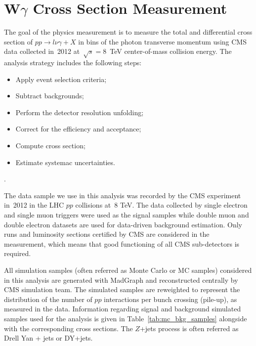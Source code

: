 \chapter{W$\gamma$ Cross Section Measurement}
\label{sec:AN_WgMeas}
The goal of the physics measurement is to measure the total and differential cross section of $pp \rightarrow l\nu\gamma + X$ in bins of the photon transverse momentum using CMS data collected in~2012 at~$\sqrt{s}=8$~TeV center-of-mass collision energy. The analysis strategy includes the following steps:
\begin{itemize}
  \item Apply event selection criteria;
  \item Subtract backgrounds;
  \item Perform the detector resolution unfolding;
  \item Correct for the efficiency and acceptance;
  \item Compute cross section;
  \item Estimate systemac uncertainties.
\end{itemize}
.

The data sample we use in this analysis was recorded by the CMS experiment in~2012 in the LHC $pp$ collisions at~8 TeV. The data collected by single electron and single muon triggers were used as the signal samples while double muon and double electron datasets are used for data-driven background estimation. Only runs and luminosity sections certified by CMS are considered in the measurement, which means that good functioning of all CMS sub-detectors is required.

All simulation samples (often referred as Monte Carlo or MC samples) considered in this analysis are generated with MadGraph and reconstructed centrally by CMS simulation team. The simulated samples are reweighted to represent the distribution of the number of $pp$ interactions per bunch crossing (pile-up), as measured in the data. Information regarding signal and background simulated samples used for the analysis is given in Table~\ref{tab:mc_bkg_samples} alongside with the corresponding cross sections. The $Z$+jets process is often referred as Drell Yan + jets or DY+jets.

